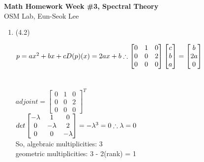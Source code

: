 \documentclass[letterpaper,12pt]{article}
\theoremstyle{definition}
\begin{document}
\begin{flushleft}
   \textbf{\large{Math Homework Week \#3, Spectral Theory}} \\[5pt]
   OSM Lab, Eun-Seok Lee \\[5pt]

\end{flushleft}

\vspace{5mm}

\begin{enumerate}

	\item (4.2) 

$p = ax^2 + bx + c \\ \\
D(p)(x)=2ax+b\\ \\
 \therefore \begin{bmatrix}
0&1&0\\0&0&2\\0&0&0\end{bmatrix} \begin{bmatrix}
c\\b\\a\end{bmatrix} = \begin{bmatrix}b\\2a\\0\end{bmatrix}$  \\ \\ \\
$adjoint = \begin{bmatrix}
0&1&0\\0&0&2\\0&0&0\end{bmatrix}^T$ \\

$det\begin{bmatrix} - \lambda & 1 & 0\\ 0 & -\lambda & 2\\ 0 & 0 &-\lambda\end{bmatrix} = -\lambda^3=0 \\ \\ \therefore \lambda = 0$ \\
So, algebraic multiplicities: 3 \\
geometric multiplicities: 3 - 2(rank) = 1 



\end{enumerate}
\end{document}
